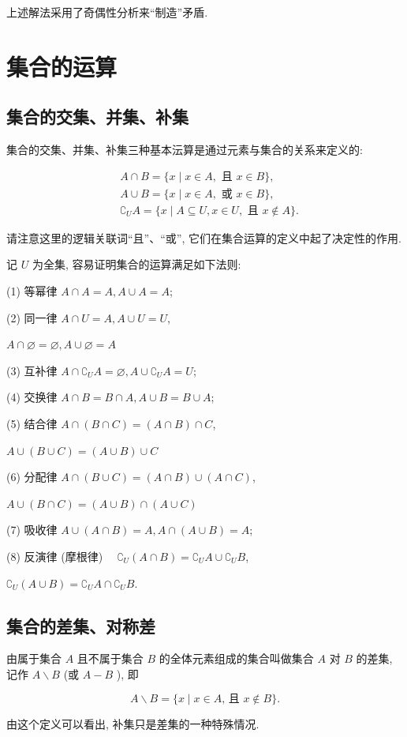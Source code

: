 \begin{note}
上述解法采用了奇偶性分析来“制造”矛盾.
\end{note}

\section{集合的运算}

\subsection{集合的交集、并集、补集}
集合的交集、并集、补集三种基本沄算是通过元素与集合的关系来定义的:

$$
\begin{aligned}
& A \cap B=\{x \mid x \in A, \text { 且 } x \in B\}, \\
& A \cup B=\{x \mid x \in A, \text { 或 } x \in B\}, \\
& \complement_{U} A=\{x \mid A \subseteq U, x \in U, \text { 且 } x \notin A\} .
\end{aligned}
$$

请注意这里的逻辑关联词“且”、“或”, 它们在集合运算的定义中起了决定性的作用.

记 $U$ 为全集, 容易证明集合的运算满足如下法则:

(1) 等幂律 $A \cap A=A, A \cup A=A$;

(2) 同一律 $A \cap U=A, A \cup U=U$,

$A \cap \varnothing=\varnothing, A \cup \varnothing=A$

(3) 互补律 $A \cap \complement_{U} A=\varnothing, A \cup \complement_{U} A=U$;

(4) 交换律 $A \cap B=B \cap A, A \cup B=B \cup A$;

(5) 结合律 $A \cap(B \cap C)=(A \cap B) \cap C$,

$A \cup(B \cup C)=(A \cup B) \cup C$

(6) 分配律 $A \cap(B \cup C)=(A \cap B) \cup(A \cap C)$,

$A \cup(B \cap C)=(A \cup B) \cap(A \cup C)$

(7) 吸收律 $A \cup(A \cap B)=A, A \cap(A \cup B)=A$;

(8) 反演律 (摩根律) $\quad \complement_{U}(A \cap B)=\complement_{U} A \cup \complement_{U} B$,

$\complement_{U}(A \cup B)=\complement_{U} A \cap \complement_{U} B$.

\subsection{集合的差集、对称差}
\begin{definition}
由属于集合 $A$ 且不属于集合 $B$ 的全体元素组成的集合叫做集合 $A$ 对 $B$ 的差集, 记作 $A \backslash B$ (或 $A-B$ ), 即

$$
A \backslash B=\{x \mid x \in A \text {, 且 } x \notin B\} .
$$
\end{definition}
由这个定义可以看出, 补集只是差集的一种特殊情况.

